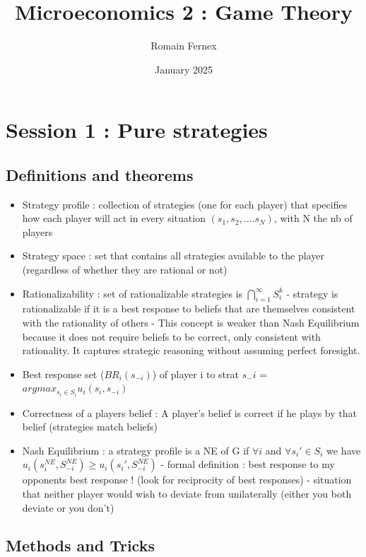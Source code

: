 \documentclass{article}
\title{Microeconomics 2 : Game Theory}
\author{Romain Fernex}
\date{January 2025}
\begin{document}
\maketitle
\tableofcontents
\newpage

\section{Session 1 : Pure strategies}
\subsection{Definitions and theorems}
\begin{itemize}
    \item Strategy profile : collection of strategies (one for each player) that specifies how each player will act in every situation $(s_1,s_2,....s_N)$, with N the nb of players
    \item Strategy space : set that contains all strategies available to the player (regardless of whether they are rational or not)
    \item Rationalizability : set of rationalizable strategies is $\bigcap_{i=1}^\infty S_i^k $
        \subitem - strategy is rationalizable if it is a best response to beliefs that are themselves consistent with the rationality of others
        \subitem - This concept is weaker than Nash Equilibrium because it does not require beliefs to be correct, only consistent with rationality. It captures strategic reasoning without assuming perfect foresight.
    \item Best response set ($BR_i(s_{-i})$) of player i to strat $s_-i$ = $argmax_{s_i\in S_i} u_i(s_i,s_{-i})$
    \item Correctness of a players belief : A player's belief is correct if he plays by that belief (strategies match beliefs)
    \item Nash Equilibrium : a strategy profile is a NE of G if $\forall i$ and $\forall s_i' \in S_i$ we have $u_i(s_i^{NE},S_{-i}^{NE})\geq u_i(s_i',S_{-i}^{NE}) $
        \subitem - formal definition : best response to my opponents best response ! (look for reciprocity of best responses)
        \subitem - situation that neither player would wish to deviate from unilaterally (either you both deviate or you don't)
\end{itemize}

\subsection{Methods and Tricks}
\end{document}
